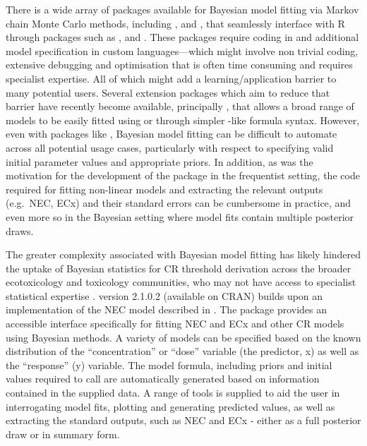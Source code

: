 \documentclass[
  shortnames]{jss}
\begin{document}
There is a wide array of packages available for Bayesian model fitting via Markov chain Monte Carlo methods, including  \citep{Lunn2000},  \citep{Plummer2003} and  \citep{Carpenter2017}, that seamlessly interface with R through packages such as ,  \citep{Su2015} and  \citep{rstan2021}. These packages require coding in  and additional model specification in custom languages---which might involve non trivial coding, extensive debugging and optimisation that is often time consuming and requires specialist expertise. All of which might add a learning/application barrier to many potential users. Several extension packages which aim to reduce that barrier have recently become available, principally  \citep{Burkner2017}, that allows a broad range of models to be easily fitted using \citep{rstan2021} or  \citep{cmdstanr2022} through simpler -like formula syntax. However, even with packages like , Bayesian model fitting can be difficult to automate across all potential usage cases, particularly with respect to specifying valid initial parameter values and appropriate priors. In addition, as was the motivation for the development of the  package in the frequentist setting, the  code required for fitting non-linear models and extracting the relevant outputs (e.g.~NEC, ECx) and their standard errors can be cumbersome in practice, and even more so in the Bayesian setting where model fits contain multiple posterior draws.

The greater complexity associated with Bayesian model fitting has likely hindered the uptake of Bayesian statistics for CR threshold derivation across the broader ecotoxicology and toxicology communities, who may not have access to specialist statistical expertise \citep{Fisher2019}.  version 2.1.0.2 (available on CRAN) builds upon an implementation of the NEC model described in \citep{Fox2010, Pires2002}. The  package provides an accessible interface specifically for fitting NEC and ECx and other CR models using Bayesian methods. A variety of models can be specified based on the known distribution of the ``concentration'' or ``dose'' variable (the predictor, x) as well as the ``response'' (y) variable. The model formula, including priors and initial values required to call  are automatically generated based on information contained in the supplied data. A range of tools is supplied to aid the user in interrogating model fits, plotting and generating predicted values, as well as extracting the standard outputs, such as NEC and ECx - either as a full posterior draw or in summary form.
\end{document}
